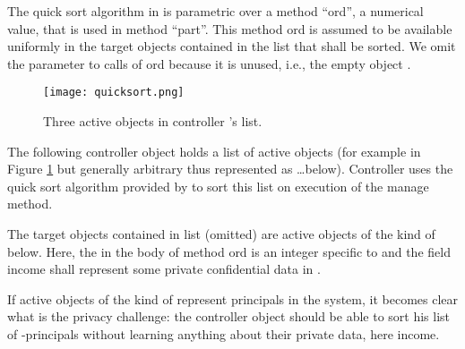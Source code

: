 \documentclass[10pt, conference, compsocconf]{IEEEtran}
\begin{document}
{The quick sort algorithm in  is parametric over a method ``ord'', a numerical value, that is used in method ``part''. This method ord  is assumed to 
be available uniformly in the target objects  contained in the list that shall be sorted. We 
omit the parameter to calls of ord because it is unused, i.e., the empty object .

\begin{figure}
\vspace{-5ex}
\begin{center}
\texttt{[image: quicksort.png]}
\end{center}
\vspace{-3ex}
\caption{Three active objects  in controller 's list.}
\label{fig:qsort}
\vspace{-5ex}
\end{figure}


The following controller object  holds a list of active objects (for example
 in Figure \ref{fig:qsort} but generally arbitrary thus represented
as \dots below). Controller  uses the quick sort algorithm provided by  to sort this list on execution
of the manage method.

\begin{small}

\end{small}

The target objects contained in  list (omitted) are active objects of the
kind of  below. Here, the  in the body of method ord is an integer specific to 
and the field income shall represent some private confidential data in . 

\begin{small}

\end{small}

If active objects of the kind of  represent principals in the system,
it becomes clear what is the privacy challenge: the controller object  should be able to
sort his list of -principals without learning anything about their
private data, here income. 


}
\end{document}
